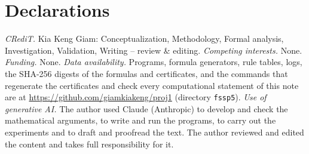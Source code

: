 \documentclass[3p]{elsarticle}
\theoremstyle{remark}
\begin{document}
\section*{Declarations}
\noindent\emph{CRediT.} Kia Keng Giam: Conceptualization, Methodology, Formal
analysis, Investigation, Validation, Writing -- review \& editing.
\emph{Competing interests.} None. \emph{Funding.} None. \emph{Data
availability.} Programs, formula generators, rule tables, logs, the SHA-256
digests of the formulas and certificates, and the commands that regenerate
the certificates and check every computational statement of this note are at
\url{https://github.com/giamkiakeng/proj1} (directory \texttt{fssp5}).
\emph{Use of generative AI.} The author used Claude (Anthropic) to develop and
check the mathematical arguments, to write and run the programs, to carry out
the experiments and to draft and proofread the text. The author reviewed and
edited the content and takes full responsibility for it.

\renewcommand{\bibfont}{\small}


\end{document}
